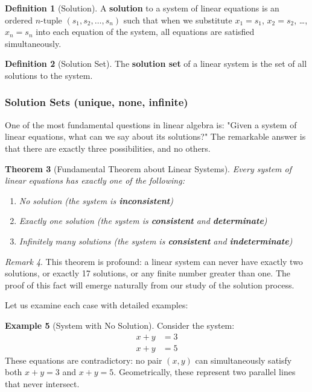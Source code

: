 \documentclass[12pt]{article}
\numberwithin{equation}{section}
\theoremstyle{plain}
\newtheorem{theorem}{Theorem}[section]
\theoremstyle{definition}
\newtheorem{definition}[theorem]{Definition}
\newtheorem{example}[theorem]{Example}
\theoremstyle{remark}
\newtheorem{remark}[theorem]{Remark}
\begin{document}
\begin{definition}[Solution]
A \textbf{solution} to a system of linear equations is an ordered $n$-tuple $(s_1, s_2, \ldots, s_n)$ such that when we substitute $x_1 = s_1$, $x_2 = s_2$, \ldots, $x_n = s_n$ into each equation of the system, all equations are satisfied simultaneously.
\end{definition}

\begin{definition}[Solution Set]
The \textbf{solution set} of a linear system is the set of all solutions to the system.
\end{definition}

\subsubsection{Solution Sets (unique, none, infinite)}

One of the most fundamental questions in linear algebra is: "Given a system of linear equations, what can we say about its solutions?" The remarkable answer is that there are exactly three possibilities, and no others.

\begin{theorem}[Fundamental Theorem about Linear Systems]
Every system of linear equations has exactly one of the following:
\begin{enumerate}
\item No solution (the system is \textbf{inconsistent})
\item Exactly one solution (the system is \textbf{consistent} and \textbf{determinate})
\item Infinitely many solutions (the system is \textbf{consistent} and \textbf{indeterminate})
\end{enumerate}
\end{theorem}

\begin{remark}
This theorem is profound: a linear system can never have exactly two solutions, or exactly 17 solutions, or any finite number greater than one. The proof of this fact will emerge naturally from our study of the solution process.
\end{remark}

Let us examine each case with detailed examples:

\begin{example}[System with No Solution]
Consider the system:
\begin{align}
x + y &= 3\\
x + y &= 5
\end{align}
These equations are contradictory: no pair $(x,y)$ can simultaneously satisfy both $x + y = 3$ and $x + y = 5$. Geometrically, these represent two parallel lines that never intersect.
\end{example}
\end{document}
